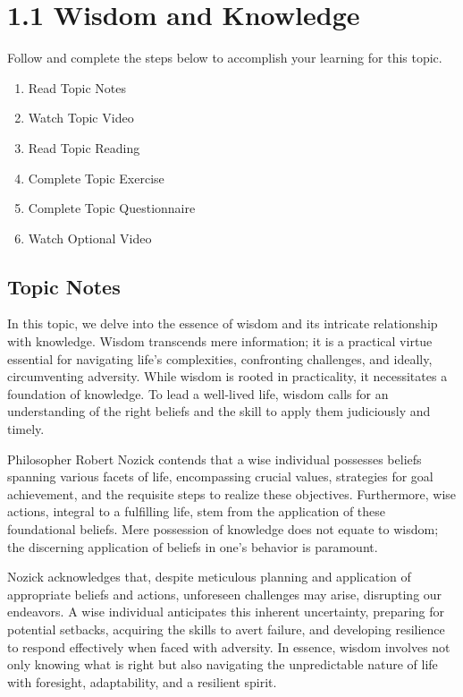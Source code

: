 \documentclass[
]{book}
\providecommand{\tightlist}{%
  \setlength{\itemsep}{0pt}\setlength{\parskip}{0pt}}
\begin{document}
\hypertarget{wisdom-and-knowledge}{%
\section*{1.1 Wisdom and Knowledge}\label{wisdom-and-knowledge}}

Follow and complete the steps below to accomplish your learning for this topic.

\begin{enumerate}
\def\labelenumi{\arabic{enumi}.}
\tightlist
\item
  Read Topic Notes
\item
  Watch Topic Video
\item
  Read Topic Reading
\item
  Complete Topic Exercise
\item
  Complete Topic Questionnaire
\item
  Watch Optional Video
\end{enumerate}

\hypertarget{topic-notes}{%
\subsection*{Topic Notes}\label{topic-notes}}

In this topic, we delve into the essence of wisdom and its intricate relationship with knowledge. Wisdom transcends mere information; it is a practical virtue essential for navigating life's complexities, confronting challenges, and ideally, circumventing adversity. While wisdom is rooted in practicality, it necessitates a foundation of knowledge. To lead a well-lived life, wisdom calls for an understanding of the right beliefs and the skill to apply them judiciously and timely.

Philosopher Robert Nozick contends that a wise individual possesses beliefs spanning various facets of life, encompassing crucial values, strategies for goal achievement, and the requisite steps to realize these objectives. Furthermore, wise actions, integral to a fulfilling life, stem from the application of these foundational beliefs. Mere possession of knowledge does not equate to wisdom; the discerning application of beliefs in one's behavior is paramount.

Nozick acknowledges that, despite meticulous planning and application of appropriate beliefs and actions, unforeseen challenges may arise, disrupting our endeavors. A wise individual anticipates this inherent uncertainty, preparing for potential setbacks, acquiring the skills to avert failure, and developing resilience to respond effectively when faced with adversity. In essence, wisdom involves not only knowing what is right but also navigating the unpredictable nature of life with foresight, adaptability, and a resilient spirit.
\end{document}
